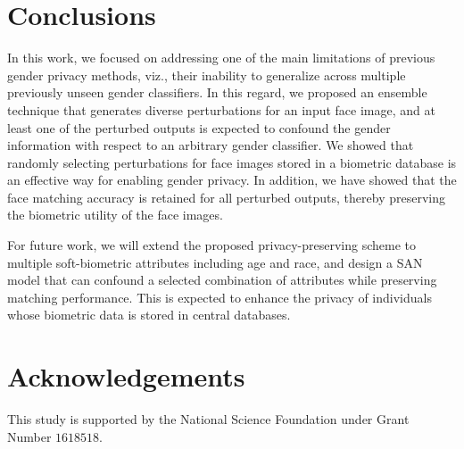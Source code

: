 \documentclass[10pt,twocolumn,letterpaper]{article}
\begin{document}
\section{Conclusions}

In this work, we focused on addressing one of the main limitations of previous gender privacy methods, viz., their inability to generalize across multiple previously unseen gender classifiers. In this regard, we proposed an ensemble technique that generates diverse perturbations for an input face image, and at least one of the perturbed outputs is expected to confound the gender information with respect to an arbitrary gender classifier. We showed that randomly selecting perturbations for face images stored in a biometric database is an effective way for enabling gender privacy. In addition, we have showed that the face matching accuracy is retained for all perturbed outputs, thereby preserving the biometric utility of the face images.

For future work, we will extend the proposed privacy-preserving scheme to multiple soft-biometric attributes including age and race, and design a SAN model that can confound a selected combination of attributes while preserving matching performance.  This is expected to enhance the privacy of individuals whose biometric data is stored in central databases. %

\section{Acknowledgements}

This study is supported by the National Science Foundation under Grant Number $1618518$.

{\small

\balance

}
\end{document}
